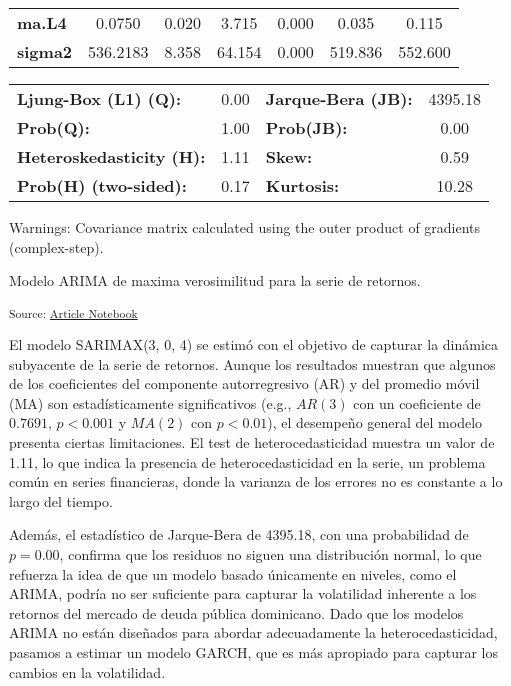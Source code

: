 \documentclass[
  number,
  preprint,
  3p,
  onecolumn]{elsarticle}
\begin{document}
\begin{center}
\begin{tabular}{lcccccc}
\textbf{ma.L4}     &       0.0750  &        0.020     &     3.715  &         0.000        &        0.035    &        0.115     \\
\textbf{sigma2}    &     536.2183  &        8.358     &    64.154  &         0.000        &      519.836    &      552.600     \\
\bottomrule
\end{tabular}
\begin{tabular}{lclc}
\textbf{Ljung-Box (L1) (Q):}     & 0.00 & \textbf{  Jarque-Bera (JB):  } & 4395.18  \\
\textbf{Prob(Q):}                & 1.00 & \textbf{  Prob(JB):          } &   0.00   \\
\textbf{Heteroskedasticity (H):} & 1.11 & \textbf{  Skew:              } &   0.59   \\
\textbf{Prob(H) (two-sided):}    & 0.17 & \textbf{  Kurtosis:          } &  10.28   \\
\bottomrule
\end{tabular}
\end{center}

Warnings: \newline
 [1] Covariance matrix calculated using the outer product of gradients (complex-step).

Modelo ARIMA de maxima verosimilitud para la serie de retornos.

\textsubscript{Source:
\href{https://iancont.github.io/fixed_income_garch/index-preview.html}{Article
Notebook}}

El modelo SARIMAX(3, 0, 4) se estimó con el objetivo de capturar la
dinámica subyacente de la serie de retornos. Aunque los resultados
muestran que algunos de los coeficientes del componente autorregresivo
(AR) y del promedio móvil (MA) son estadísticamente significativos
(e.g., \(AR(3)\) con un coeficiente de \(0.7691\), \(p < 0.001\) y
\(MA(2)\) con \(p < 0.01\)), el desempeño general del modelo presenta
ciertas limitaciones. El test de heterocedasticidad muestra un valor de
1.11, lo que indica la presencia de heterocedasticidad en la serie, un
problema común en series financieras, donde la varianza de los errores
no es constante a lo largo del tiempo.

Además, el estadístico de Jarque-Bera de 4395.18, con una probabilidad
de \(p = 0.00\), confirma que los residuos no siguen una distribución
normal, lo que refuerza la idea de que un modelo basado únicamente en
niveles, como el ARIMA, podría no ser suficiente para capturar la
volatilidad inherente a los retornos del mercado de deuda pública
dominicano. Dado que los modelos ARIMA no están diseñados para abordar
adecuadamente la heterocedasticidad, pasamos a estimar un modelo GARCH,
que es más apropiado para capturar los cambios en la volatilidad.
\end{document}
